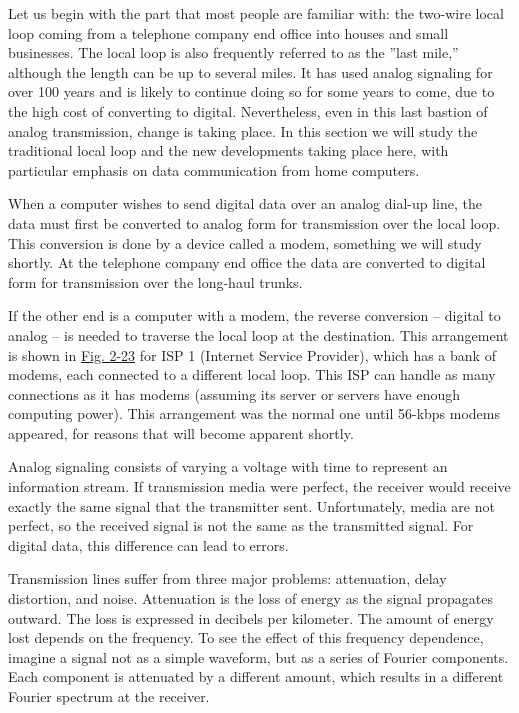 \documentclass[b5paper,11pt]{memoir}
\begin{document}
Let us begin with the part that most people are familiar with: the
two-wire local loop coming from a telephone company end office into
houses and small businesses. The local loop is also frequently referred
to as the ''last mile,'' although the length can be up to several miles.
It has used analog signaling for over 100 years and is likely to
continue doing so for some years to come, due to the high cost of
converting to digital. Nevertheless, even in this last bastion of analog
transmission, change is taking place. In this section we will study the
traditional local loop and the new developments taking place here, with
particular emphasis on data communication from home computers.

When a computer wishes to send digital data over an analog dial-up line,
the data must first be converted to analog form for transmission over
the local loop. This conversion is done by a device called a modem,
something we will study shortly. At the telephone company end office the
data are converted to digital form for transmission over the long-haul
trunks.

If the other end is a computer with a modem, the reverse
conversion -- digital to analog -- is needed to traverse the local loop at
the destination. This arrangement is shown in
\protect\hyperlink{0130661023_ch02lev1sec5.htmlux5cux23ch02fig23}{Fig.
2-23} for ISP 1 (Internet Service Provider), which has a bank of modems,
each connected to a different local loop. This ISP can handle as many
connections as it has modems (assuming its server or servers have enough
computing power). This arrangement was the normal one until 56-kbps
modems appeared, for reasons that will become apparent shortly.

Analog signaling consists of varying a voltage with time to represent an
information stream. If transmission media were perfect, the receiver
would receive exactly the same signal that the transmitter sent.
Unfortunately, media are not perfect, so the received signal is not the
same as the transmitted signal. For digital data, this difference can
lead to errors.

Transmission lines suffer from three major problems: attenuation, delay
distortion, and noise. {Attenuation} is the loss of energy as the signal
propagates outward. The loss is expressed in decibels per kilometer. The
amount of energy lost depends on the frequency. To see the effect of
this frequency dependence, imagine a signal not as a simple waveform,
but as a series of Fourier components. Each component is attenuated by a
different amount, which results in a different Fourier spectrum at the
receiver.
\end{document}
